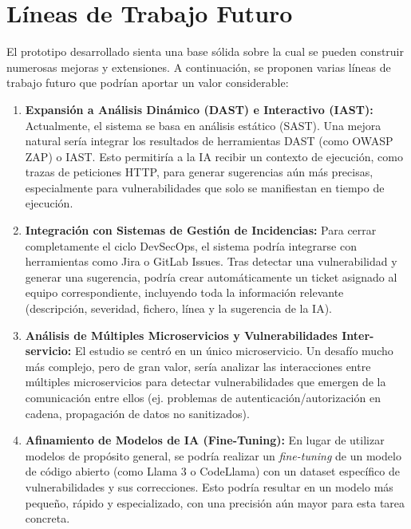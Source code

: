 \section{Líneas de Trabajo Futuro}\label{sec:trabajofuturo}

El prototipo desarrollado sienta una base sólida sobre la cual se pueden construir numerosas mejoras y extensiones. A continuación, se proponen varias líneas de trabajo futuro que podrían aportar un valor considerable:

\begin{enumerate}
    \item \textbf{Expansión a Análisis Dinámico (DAST) e Interactivo (IAST):} Actualmente, el sistema se basa en análisis estático (SAST). Una mejora natural sería integrar los resultados de herramientas DAST (como OWASP ZAP) o IAST. Esto permitiría a la IA recibir un contexto de ejecución, como trazas de peticiones HTTP, para generar sugerencias aún más precisas, especialmente para vulnerabilidades que solo se manifiestan en tiempo de ejecución.

    \item \textbf{Integración con Sistemas de Gestión de Incidencias:} Para cerrar completamente el ciclo DevSecOps, el sistema podría integrarse con herramientas como Jira o GitLab Issues. Tras detectar una vulnerabilidad y generar una sugerencia, podría crear automáticamente un ticket asignado al equipo correspondiente, incluyendo toda la información relevante (descripción, severidad, fichero, línea y la sugerencia de la IA).

    \item \textbf{Análisis de Múltiples Microservicios y Vulnerabilidades Inter-servicio:} El estudio se centró en un único microservicio. Un desafío mucho más complejo, pero de gran valor, sería analizar las interacciones entre múltiples microservicios para detectar vulnerabilidades que emergen de la comunicación entre ellos (ej. problemas de autenticación/autorización en cadena, propagación de datos no sanitizados).

    \item \textbf{Afinamiento de Modelos de IA (Fine-Tuning):} En lugar de utilizar modelos de propósito general, se podría realizar un \textit{fine-tuning} de un modelo de código abierto (como Llama 3 o CodeLlama) con un dataset específico de vulnerabilidades y sus correcciones. Esto podría resultar en un modelo más pequeño, rápido y especializado, con una precisión aún mayor para esta tarea concreta.


\end{enumerate}
